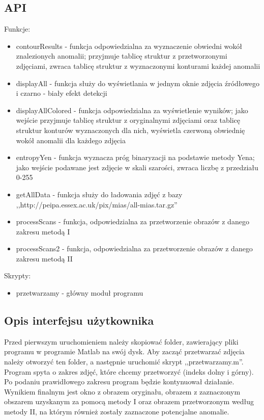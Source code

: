 \documentclass[11pt,openany]{sprawozdanie-agh}
\begin{document}
\subsection{API}
Funkcje:
\begin{itemize}
\item contourResults - funkcja odpowiedzialna za wyznaczenie obwiedni wokół znalezionych anomalii; przyjmuje tablicę struktur z przetworzonymi zdjęciami, zwraca tablicę struktur z wyznaczonymi konturami każdej anomalii
\item displayAll - funkcja służy do wyświetlania w jednym oknie zdjęcia źródłowego i czarno - biały efekt detekcji
\item displayAllColored - funkcja odpowiedzialna za wyświetlenie wyników; jako wejście przyjmuje tablicę struktur z oryginalnymi zdjęciami oraz tablicę struktur konturów wyznaczonych dla nich, wyświetla czerwoną obwiednię wokół anomalii dla każdego zdjęcia
\item entropyYen - funkcja wyznacza próg binaryzacji na podstawie metody Yena; jako wejście podawane jest zdjęcie w skali szarości, zwraca liczbę z przedziału 0-255
\item getAllData - funkcja służy do ładowania zdjęć z bazy ,,http://peipa.essex.ac.uk/pix/mias/all-mias.tar.gz''
\item processScans - funkcja, odpowiedzialna za przetworzenie obrazów z danego zakresu metodą I
\item processScans2 - funkcja, odpowiedzialna za przetworzenie obrazów z danego zakresu metodą II
\end{itemize}
Skrypty:
\begin{itemize}
\item przetwarzamy - główny moduł programu
\end{itemize}

\subsection{Opis interfejsu użytkownika}
Przed pierwszym uruchomieniem należy skopiować folder, zawierający pliki programu w programie Matlab na swój dysk. Aby zacząć przetwarzać zdjęcia należy otworzyć ten folder, a następnie uruchomić skrypt ,,przetwarzamy.m''. Program spyta o zakres zdjęć, które chcemy przetworzyć (indeks dolny i górny). Po podaniu prawidłowego zakresu program będzie kontynuował działanie. Wynikiem finalnym jest okno z obrazem oryginału, obrazem z zaznaczonym obszarem uzyskanym za pomocą metody I oraz obrazem przetworzonym według metody II, na którym również zostały zaznaczone potencjalne anomalie.



\end{document}
